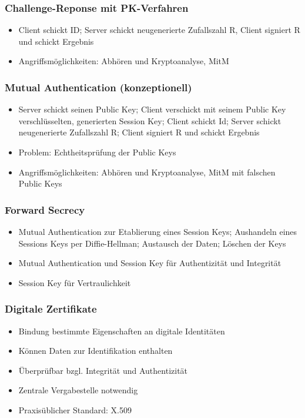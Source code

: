 \subsubsection{Challenge-Reponse mit PK-Verfahren}
\begin{itemize}
	\item Client schickt ID; Server schickt neugenerierte Zufallszahl R, Client signiert R und schickt Ergebnis
	\item Angriffsmöglichkeiten: Abhören und Kryptoanalyse, MitM
\end{itemize}

\subsubsection{Mutual Authentication (konzeptionell)}
\begin{itemize}
	\item Server schickt seinen Public Key; Client verschickt mit seinem Public Key verschlüsselten, generierten Session Key; Client schickt Id; Server schickt neugenerierte Zufallszahl R; Client signiert R und schickt Ergebnis
	\item Problem: Echtheitsprüfung der Public Keys
	\item Angriffsmöglichkeiten: Abhören und Kryptoanalyse, MitM mit falschen Public Keys
\end{itemize}

\subsubsection{Forward Secrecy}
\begin{itemize}
	\item Mutual Authentication zur Etablierung eines Session Keys; Aushandeln eines Sessions Keys per Diffie-Hellman; Austausch der Daten; Löschen der Keys
	\item Mutual Authentication und Session Key für Authentizität und Integrität
	\item Session Key für Vertraulichkeit
\end{itemize}

\subsubsection{Digitale Zertifikate}
\begin{itemize}
	\item Bindung bestimmte Eigenschaften an digitale Identitäten
	\item Können Daten zur Identifikation enthalten
	\item Überprüfbar bzgl. Integrität und Authentizität
	\item Zentrale Vergabestelle notwendig
	\item Praxisüblicher Standard: X.509
\end{itemize}

